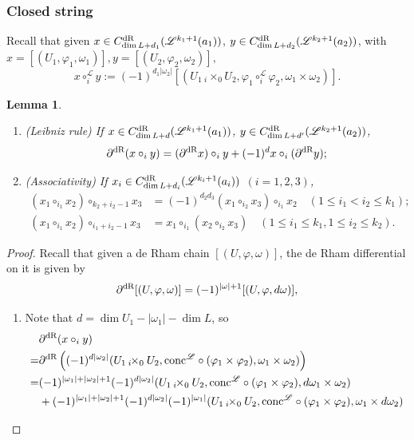 \documentclass[10pt]{amsart}
\numberwithin{equation}{section}
\theoremstyle{plain}
\newtheorem{lemma}[theorem]{Lemma}
\theoremstyle{definition}
\theoremstyle{remark}
\numberwithin{equation}{section}
\newcommand{\dR}{\textup{dR}}
\newcommand{\fiberprod}[2]{\,_{#1}\!\!\times_{#2} }
\newcommand{\conc}{\textup{conc}^\mathscr{L}}
\begin{document}
{\subsubsection{Closed string}\label{Subsubsc: SignClosedString}
Recall that given $x\in C_{\dim L +d_1}^\dR( \mathscr{L}^{k_1+1}(a_1))$, $y\in C_{\dim L + d_2}^\dR(\mathscr{L}^{k_2+1} (a_2))$, with $x=[(U_1,\varphi_1,\omega_1)], y=[(U_2,\varphi_2,\omega_2)],$
\[
	x\circ_i^\mathscr{L} y:= (-1)^{d_1|\omega_2|}[(U_1\fiberprod{i}{0}U_2, \varphi_1\circ_i^\mathscr{L} \varphi_2, \omega_1\times \omega_2)].
\]
\begin{lemma}\label{Lm: dRchainClosedStringApp}
	\begin{enumerate}
		\item (Leibniz rule)  If $x\in C_{\dim L +d}^\dR( \mathscr{L}^{k_1+1}(a_1))$, $y\in C_{\dim L + d'}^\dR(\mathscr{L}^{k_2+1} (a_2))$,\[\partial^\dR(x\circ_i y)  = (\partial^\dR x) \circ_i y + (-1)^{d} x\circ_i (\partial^\dR y);\]
		\item (Associativity) If $x_i\in C^\dR_{\dim L+d_i}(\mathscr{L}^{k_i+1}(a_i))$ $(i=1,2,3)$,
		\begin{align*}
			(x_1\circ_{i_1} x_2)\circ_{k_2+i_2-1} x_3&= (-1)^{d_2d_3}(x_1\circ_{i_2} x_3)\circ_{i_1}x_2 \quad (1\leq i_1<i_2\leq k_1);\\
			(x_1\circ_{i_1} x_2)\circ_{i_1+i_2-1}x_3 &= x_1\circ_{i_1} (x_2\circ_{i_2} x_3) \quad (1\leq i_1\leq k_1, 1\leq i_2\leq k_2).
		\end{align*}
	\end{enumerate}
\end{lemma}
\begin{proof}
		Recall that given a de Rham chain $[(U,\varphi,\omega)]$, the de Rham differential on it is given by
\[
	\partial^\dR [(U,\varphi,\omega)]=(-1)^{|\omega|+1}[(U,\varphi,d\omega)],
\]
	\begin{enumerate}
		\item Note that $d = \dim U_1-|\omega_1|-\dim L$, so \begin{align*}
			&\partial^\dR(x\circ_iy)\\= &\partial^\dR\left((-1)^{d|\omega_2|} (U_1\fiberprod{i}{0} U_2,\conc\circ (\varphi_1\times \varphi_2), \omega_1\times \omega_2) \right)\\
			=& (-1)^{|\omega_1|+|\omega_2|+1}(-1)^{d|\omega_2|}(U_1\fiberprod{i}{0}U_2, \conc\circ (\varphi_1\times \varphi_2), d\omega_1\times \omega_2)\\
			&+ (-1)^{|\omega_1|+|\omega_2|+1}(-1)^{d|\omega_2|}(-1)^{|\omega_1|}(U_1\fiberprod{i}{0}U_2, \conc \circ (\varphi_1\times \varphi_2), \omega_1\times d\omega_2)

\end{align*}
\end{enumerate}
\end{proof}}
\end{document}
